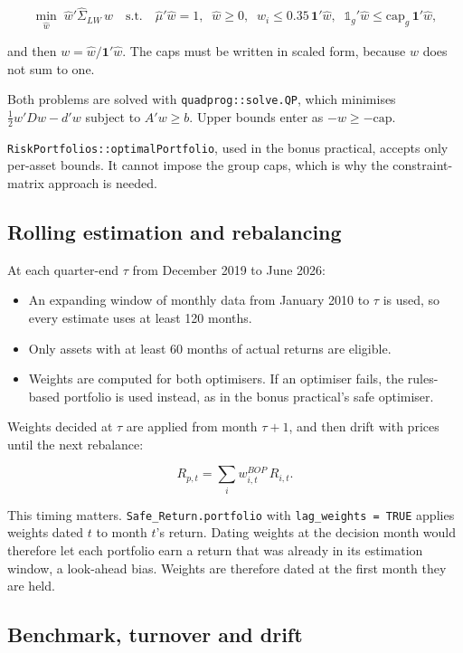 \documentclass[11pt,preprint]{elsarticle}
\numberwithin{equation}{section}
\numberwithin{figure}{section}
\numberwithin{table}{section}
\def\tightlist{} %
\begin{document}
\[
\min_{\hat{w}} \; \hat{w}'\hat{\Sigma}_{LW}\,\hat{w}
\quad \text{s.t.} \quad
\hat{\mu}'\hat{w} = 1,\;\; \hat{w} \ge 0,\;\;
\hat{w}_i \le 0.35\,\mathbf{1}'\hat{w},\;\;
\mathbb{1}_g'\hat{w} \le \text{cap}_g\,\mathbf{1}'\hat{w},
\]

and then \(w = \hat{w}/\mathbf{1}'\hat{w}\). The caps must be written in
scaled form, because \(\hat{w}\) does not sum to one.

Both problems are solved with \texttt{quadprog::solve.QP}, which
minimises \(\tfrac{1}{2}w'Dw - d'w\) subject to \(A'w \ge b\). Upper
bounds enter as \(-w \ge -\text{cap}\).

\texttt{RiskPortfolios::optimalPortfolio}, used in the bonus practical,
accepts only per-asset bounds. It cannot impose the group caps, which is
why the constraint-matrix approach is needed.

\subsection{Rolling estimation and
rebalancing}\label{rolling-estimation-and-rebalancing}

At each quarter-end \(\tau\) from December 2019 to June 2026:

\begin{itemize}
\tightlist
\item
  An expanding window of monthly data from January 2010 to \(\tau\) is
  used, so every estimate uses at least 120 months.
\item
  Only assets with at least 60 months of actual returns are eligible.
\item
  Weights are computed for both optimisers. If an optimiser fails, the
  rules-based portfolio is used instead, as in the bonus practical's
  safe optimiser.
\end{itemize}

Weights decided at \(\tau\) are applied from month \(\tau+1\), and then
drift with prices until the next rebalance:

\[
R_{p,t} = \sum_i w^{BOP}_{i,t}\, R_{i,t}.
\]

This timing matters. \texttt{Safe\_Return.portfolio} with
\texttt{lag\_weights\ =\ TRUE} applies weights dated \(t\) to month
\(t\)'s return. Dating weights at the decision month would therefore let
each portfolio earn a return that was already in its estimation window,
a look-ahead bias. Weights are therefore dated at the first month they
are held.

\subsection{Benchmark, turnover and
drift}\label{benchmark-turnover-and-drift}
\end{document}
